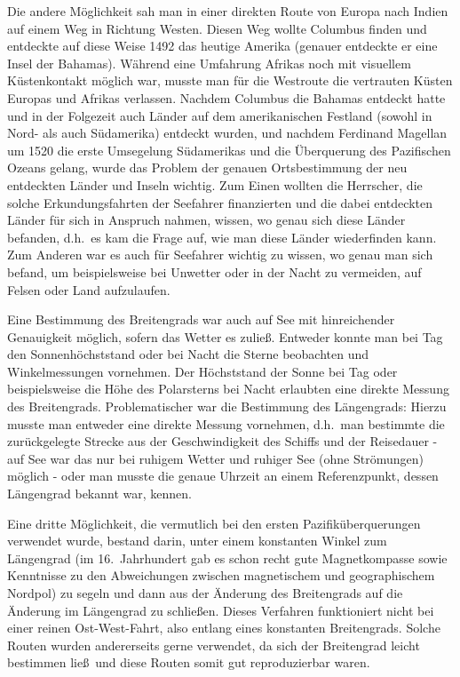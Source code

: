 Die andere M\"oglichkeit sah man in einer direkten Route von Europa nach Indien auf einem Weg
in Richtung Westen. 
Diesen Weg wollte Columbus finden und entdeckte auf diese Weise
1492 das heutige Amerika (genauer entdeckte er eine Insel der Bahamas). W\"ahrend eine Umfahrung Afrikas
noch mit visuellem K\"ustenkontakt m\"oglich war, musste man f\"ur die Westroute die
vertrauten K\"usten Europas und Afrikas verlassen. Nachdem Columbus die Bahamas entdeckt hatte 
und in der Folgezeit auch L\"ander auf dem amerikanischen Festland
(sowohl in Nord- als auch S\"udamerika) entdeckt wurden, und nachdem 
Ferdinand Magellan 
um 1520 die erste Umsegelung S\"udamerikas und die \"Uberquerung des Pazifischen Ozeans
gelang, wurde das Problem der genauen Ortsbestimmung der neu entdeckten L\"ander und
Inseln wichtig. Zum Einen wollten die Herrscher, die solche Erkundungsfahrten der Seefahrer
finanzierten und die dabei entdeckten L\"ander f\"ur sich in Anspruch nahmen, wissen, wo 
genau sich diese L\"ander befanden, d.h.\ es kam die Frage auf, wie man diese L\"ander wiederfinden kann. 
Zum Anderen war es auch f\"ur Seefahrer wichtig zu wissen, wo genau man sich
befand, um beispielsweise bei Unwetter oder in der Nacht zu vermeiden, auf Felsen oder
Land aufzulaufen. 

Eine Bestimmung des Breitengrads 
war auch auf See mit hinreichender Genauigkeit
m\"oglich, sofern das Wetter es zulie\ss. Entweder konnte man bei Tag den Sonnenh\"ochststand oder
bei Nacht die Sterne beobachten und Winkelmessungen vornehmen. Der H\"ochststand der Sonne bei
Tag oder beispielsweise die H\"ohe des Polarsterns bei Nacht erlaubten eine direkte
Messung des Breitengrads. Problematischer war die Bestimmung des 
L\"angengrads:
Hierzu musste man entweder eine direkte Messung vornehmen, d.h.\ man bestimmte die zur\"uckgelegte
Strecke aus der Geschwindigkeit des Schiffs und der Reisedauer  -  auf See war das nur
bei ruhigem Wetter und ruhiger See (ohne Str\"omungen) m\"oglich - oder man musste 
die genaue Uhrzeit an einem Referenzpunkt, dessen L\"angengrad bekannt war, kennen.
 
Eine dritte M\"oglichkeit, die vermutlich bei den ersten Pazifik\"uberquerungen verwendet wurde,
bestand darin, unter einem konstanten Winkel zum L\"angengrad (im 16.\ Jahrhundert gab es
schon recht gute Magnetkompasse sowie Kenntnisse zu den Abweichungen zwischen
magnetischem und geographischem Nordpol) zu segeln und dann aus der \"Anderung des
Breitengrads auf die \"Anderung im L\"angengrad zu schlie\ss en. Dieses Verfahren funktioniert
nicht bei einer reinen Ost-West-Fahrt, also entlang eines konstanten Breitengrads. Solche Routen
wurden andererseits gerne verwendet, da sich der Breitengrad leicht bestimmen lie\ss\ und diese
Routen somit gut reproduzierbar waren.

